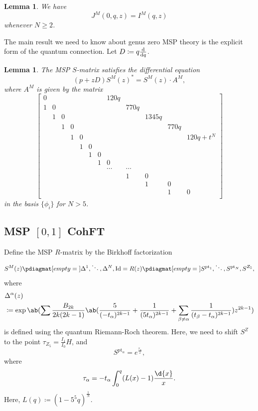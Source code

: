 \documentclass[10pt]{amsart}
\newtheorem{lem}[thm]{Lemma}
\theoremstyle{definition}
\theoremstyle{remark}
\theoremstyle{plain}
\theoremstyle{definition}
\theoremstyle{remark}
\newcommand{\mr}[1]{\mathrm{#1}}
\newcommand{\1}{\mathbf{1}}
\newcommand{\2}{\mathbf{2}}
\newcommand{\3}{\mathbf{3}}
\newcommand{\pt}{\mr{pt}}
\begin{document}
\begin{lem}
    We have
    \[ J^M(0,q,z) = I^M(q,z) \]
    whenever $N \geq 2$.
\end{lem}

The main result we need to know about genus zero MSP theory is the explicit form of the quantum connection. Let $D \coloneqq q \odv{}{q}$.
\begin{lem}
    The MSP $S$-matrix satisfies the differential equation
    \[ (p + zD)S^M(z)^* = S^M(z) \cdot A^M, \]
    where $A^M$ is given by the matrix
    \[ \begin{bmatrix}
        0 & & & & & & &  120 q \\
        1 & 0 & & & & & & & 770 q \\
        & 1 & 0 & & & & & & & 1345 q \\
        & & 1 & 0 & & & & & & & 770 q \\
        & & & 1 & 0 & & & & & & & 120 q + t^N \\
        & & & & 1 & 0 \\
        & & & & & 1 & 0 \\
        & & & & & & 1 & 0 \\
        & & & & & & & \cdots & \cdots \\
        & & & & & & & & 1 & 0 \\
        & & & & & & & & & 1 & 0 \\
        & & & & & & & & & & 1 & 0 \\
    \end{bmatrix}
    \]
    in the basis $\{ \phi_i \}$ for $N > 5$.
\end{lem}

\subsection{MSP $[0,1]$ CohFT}%
\label{sub:MSP 01 CohFT}

Define the MSP $R$-matrix by the Birkhoff factorization
\[ S^M(z) \pdiagmat[empty={}]{\Delta^1,\ddots,\Delta^N,\mr{Id}} = R(z) \pdiagmat[empty={}]{S^{\pt_1},\ddots,S^{\pt_N},S^{Z_5}}, \]
where
\begin{align*}
    &\Delta^{\alpha}(z) \\
    &\coloneqq \exp \ab(\sum \frac{B_{2k}}{2k(2k-1)} \ab(\frac{5}{(-t_{\alpha})^{2k-1}} + \frac{1}{( 5t_{\alpha} )^{2k-1}} +\sum_{\beta\neq\alpha} \frac{1}{(t_{\beta}-t_{\alpha})^{2k-1}}) z^{2k-1}) 
\end{align*}
is defined using the quantum Riemann-Roch theorem. Here, we need to shift $S^Z$ to the point $\tau_{Z_5} = \frac{I_1}{I_0} H$, and
\[ S^{\pt_{\alpha}} = e^{\frac{\tau_{\alpha}}{z}}, \]
where
\[ \tau_{\alpha} = - t_{\alpha} \int_0^q (L(x)-1) \frac{\d{x}}{x}. \]
Here, $L(q) \coloneqq (1-5^5q)^{\frac{1}{N}}$.
\end{document}
